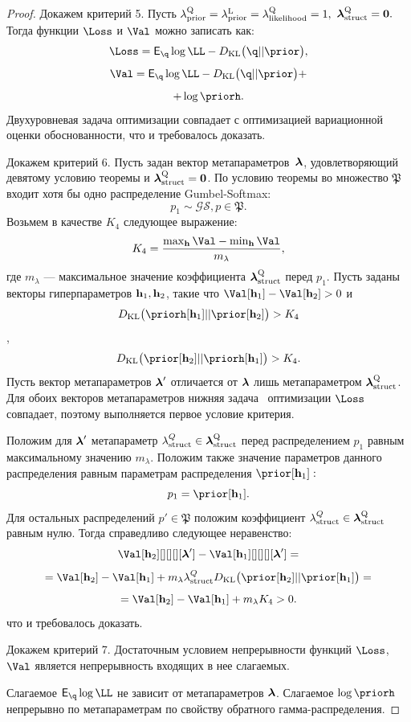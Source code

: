 \begin{proof}
Докажем критерий 5. Пусть $\lambda_\text{prior}^\text{Q} = \lambda_\text{prior}^\text{L} = \lambda_\text{likelihood}^\text{Q} = 1,$ $\boldsymbol{\lambda}_\text{struct}^\text{Q} = \mathbf{0}.$ Тогда функции $\Loss$ и $\Val$  можно записать как: 
$$\Loss = \E_{\q} \log \LL - \KL{\q}{\prior},$$
$$ \Val = \E_{\q} \log \LL - \KL{\q}{\prior}+$$
$$ + \log\priorh.$$
Двухуровневая задача оптимизации совпадает с оптимизацией вариационной оценки обоснованности, что и требовалось доказать.

Докажем критерий 6. 
Пусть задан вектор метапараметров~$\boldsymbol{\lambda}$, удовлетворяющий девятому условию теоремы и $\boldsymbol{\lambda}_\text{struct}^\text{Q} = \mathbf{0}$. 
По условию теоремы во множество $\mathfrak{P}$ входит хотя бы одно распределение Gumbel-Softmax:
\[
    p_1 \sim \mathcal{GS}, p \in \mathfrak{P}.
\]
Возьмем в качестве $K_4$ следующее выражение:
\[
K_4 = \frac{\max_{\h} \Val - \min_{\h }\Val}{m_{\lambda}},
\]
где $m_{\lambda}$ --- максимальное значение коэффициента $\boldsymbol{\lambda}_\text{struct}^\text{Q}$ перед $p_1$.
Пусть заданы векторы гиперпараметров $\mathbf{h}_1, \mathbf{h}_2$, такие что $\Val[\h_1] - \Val[\h_2]>0$ и $$\KL{\priorh[{\h_1}]}{\prior[{\h_2}]} > K_4$$, $$\KL{\prior[{\h_2}]}{\priorh[{\h_1}]} > K_4.$$
Пусть вектор метапараметров $\boldsymbol{\lambda}'$ отличается от $\boldsymbol{\lambda}$ лишь метапараметром $\boldsymbol{\lambda}_\text{struct}^\text{Q}$. Для  обоих векторов метапараметров нижняя задача  оптимизации $\Loss$ совпадает, поэтому выполняется первое условие критерия.


Положим для $\boldsymbol{\lambda}'$ метапараметр $\lambda^{Q}_\text{struct} \in \boldsymbol{\lambda}_\text{struct}^\text{Q}$ перед распределением $p_1$  равным максимальному значению $m_{\lambda}$. Положим также значение параметров данного распределения равным параметрам распределения $\prior[\h_1]:$
\[
    p_1 = \prior[\h_1].
\]
Для остальных распределений $p' \in \mathfrak{P}$ положим коэффициент $\lambda^{Q}_\text{struct} \in \boldsymbol{\lambda}_\text{struct}^\text{Q}$ равным нулю.  
Тогда справедливо следующее неравенство:
\[
\Val[\h_2][][][][\lam'] - \Val[\h_1][][][][\lam'] = 
\]
\[
=\Val[\h_2]-\Val[\h_1] + m_{\lambda}\lambda^{Q}_\text{struct} \KL{\prior[\h_2]}{\prior[\h_1]} =
\]
\[
   = \Val[\h_2]-\Val[\h_1] + m_{\lambda} K_4 > 0.
\]
что и требовалось доказать.

Докажем критерий 7.
Достаточным условием непрерывности функций $\Loss$, $\Val$ является непрерывность входящих в нее слагаемых. 

Слагаемое $\E_{\q}\log\LL$ не зависит от метапараметров $\boldsymbol{\lambda}$. Слагаемое $\log\priorh$ непрерывно по метапараметрам по свойству обратного гамма-распределения.


\end{proof}
